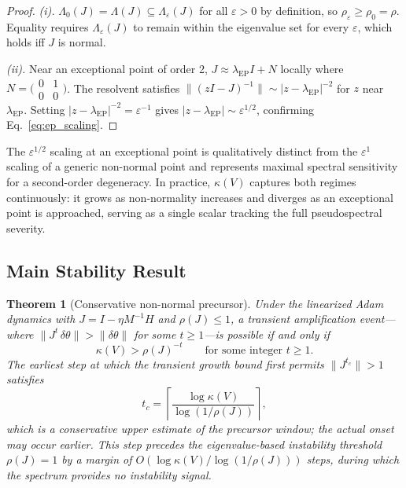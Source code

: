 \documentclass[aps,prresearch,twocolumn,superscriptaddress,longbibliography]{revtex4-2}
\newtheorem{theorem}{Theorem}
\begin{document}
\begin{proof}
\emph{(i).} $\Lambda_0(J) = \Lambda(J)\subseteq\Lambda_\varepsilon(J)$ for all
$\varepsilon>0$ by definition, so $\rho_\varepsilon\geq\rho_0 = \rho$.
Equality requires $\Lambda_\varepsilon(J)$ to remain within the eigenvalue
set for every $\varepsilon$, which holds iff $J$ is normal.

\emph{(ii).} Near an exceptional point of order 2,
$J\approx\lambda_{\mathrm{EP}}I + N$ locally where
$N = \bigl(\begin{smallmatrix}0&1\\0&0\end{smallmatrix}\bigr)$.
The resolvent satisfies
$\|(zI-J)^{-1}\|\sim|z-\lambda_{\mathrm{EP}}|^{-2}$ for $z$ near
$\lambda_{\mathrm{EP}}$.
Setting $|z-\lambda_{\mathrm{EP}}|^{-2} = \varepsilon^{-1}$ gives
$|z - \lambda_{\mathrm{EP}}|\sim\varepsilon^{1/2}$,
confirming Eq.~\eqref{eq:ep_scaling}.
\end{proof}

The $\varepsilon^{1/2}$ scaling at an exceptional point is qualitatively
distinct from the $\varepsilon^1$ scaling of a generic non-normal point and
represents maximal spectral sensitivity for a second-order degeneracy.
In practice, $\kappa(V)$ captures both regimes continuously: it grows as
non-normality increases and diverges as an exceptional point is
approached, serving as a single scalar tracking the full pseudospectral
severity.

\subsection{Main Stability Result}
\label{subsec:theorem}

\begin{theorem}[Conservative non-normal precursor]
\label{thm:precursor}
Under the linearized Adam dynamics with $J = I - \eta M^{-1}H$ and
$\rho(J)\leq 1$, a transient amplification event---where
$\|J^t\,\delta\theta\| > \|\delta\theta\|$ for some $t\geq 1$---is
possible if and only if
\begin{equation}
\kappa(V) > \rho(J)^{-t} \qquad\text{for some integer }t\geq 1.
\label{eq:precursor_cond}
\end{equation}
The earliest step at which the transient growth bound first permits
$\|J^{t_c}\|>1$ satisfies
\begin{equation}
t_c = \left\lceil
  \frac{\log\kappa(V)}{\log(1/\rho(J))}
\right\rceil,
\label{eq:tc}
\end{equation}
which is a conservative upper estimate of the precursor window; the
actual onset may occur earlier.
This step precedes the eigenvalue-based instability threshold
$\rho(J)=1$ by a margin of $O(\log\kappa(V)/\log(1/\rho(J)))$ steps,
during which the spectrum provides no instability signal.
\end{theorem}
\end{document}
